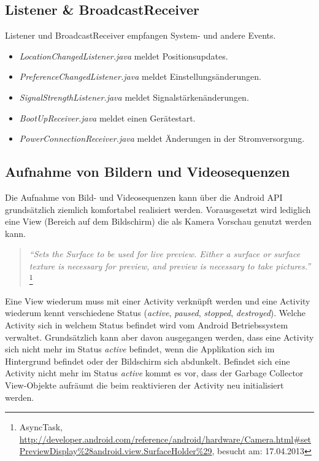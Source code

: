 \subsection{Listener \& BroadcastReceiver}
Listener und BroadcastReceiver empfangen System- und andere Events. 
\begin{itemize} [noitemsep,topsep=0pt]
	\item \textit{LocationChangedListener.java} meldet Positionsupdates.
	\item \textit{PreferenceChangedListener.java} meldet Einstellungsänderungen.
	\item \textit{SignalStrengthListener.java} meldet Signalstärkenänderungen.
	\item \textit{BootUpReceiver.java} meldet einen Gerätestart.
	\item \textit{PowerConnectionReceiver.java} meldet Änderungen in der Stromversorgung.
\end{itemize}

\subsection{Aufnahme von Bildern und Videosequenzen}
Die Aufnahme von Bild- und Videosequenzen kann über die Android API grundsätzlich ziemlich komfortabel realisiert werden. Vorausgesetzt wird lediglich eine View (Bereich auf dem Bildschirm) die als Kamera Vorschau genutzt werden kann. 

\begin{quotation}
\textit{``Sets the Surface to be used for live preview. Either a surface or surface texture is necessary for preview, and preview is necessary to take pictures.''} \footnote{AsyncTask, \url{http://developer.android.com/reference/android/hardware/Camera.html\#setPreviewDisplay\%28android.view.SurfaceHolder\%29}, besucht am: 17.04.2013}
\end{quotation}

Eine View wiederum muss mit einer Activity verknüpft werden und eine Activity wiederum kennt verschiedene Status (\textit{active}, \textit{paused}, \textit{stopped}, \textit{destroyed}). Welche Activity sich in welchem Status befindet wird vom Android Betriebssystem verwaltet. Grundsätzlich kann aber davon ausgegangen werden, dass eine Activity sich nicht mehr im Status \textit{active} befindet, wenn die Applikation sich im Hintergrund befindet oder der Bildschirm sich abdunkelt. Befindet sich eine Activity nicht mehr im Status \textit{active} kommt es vor, dass der Garbage Collector View-Objekte aufräumt die beim reaktivieren der Activity neu initialisiert werden.

